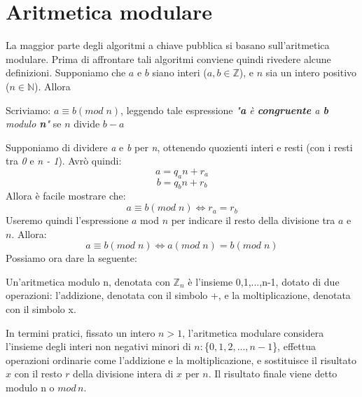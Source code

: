 \section{Aritmetica modulare}
La maggior parte degli algoritmi a chiave pubblica si basano sull'aritmetica modulare. Prima di affrontare tali algoritmi conviene quindi rivedere alcune definizioni.
\newline \newline
Supponiamo che $a$ e $b$ siano interi ($a,b \in \mathbb{Z}$), e $n$ sia un intero positivo ($n \in \mathbb{N}$). Allora 
\begin{defin}
Scriviamo: $a \equiv b(mod \; n)$, leggendo tale espressione \textit{"\textbf{a} è \textbf{congruente} a \textbf{b} modulo \textbf{n}"} se $n$ divide $b-a$
\end{defin}
Supponiamo di dividere \textit{a} e \textit{b} per \textit{n}, ottenendo quozienti interi e resti (con i resti tra \textit{0} e \textit{n - 1}). Avrò quindi:
\begin{equation}
a = q_a n + r_a
\end{equation}
\begin{equation}
b = q_b n + r_b
\end{equation}
Allora è facile mostrare che:
\begin{equation}
a \equiv b(mod \; n) \Leftrightarrow r_a = r_b
\end{equation}
Useremo quindi l'espressione $a$ mod $n$ per indicare il resto della divisione tra $a$ e $n$. Allora:
\begin{equation}
a \equiv b(mod \; n) \Leftrightarrow a(mod \; n) = b(mod \; n)
\end{equation}
Possiamo ora dare la seguente:
\begin{defin}
Un'aritmetica modulo n, denotata con $\mathbb{Z}_n$ è l'insieme {0,1,...,n-1}, dotato di due operazioni: l'addizione, denotata con il simbolo +, e la moltiplicazione, denotata con il simbolo x.
\end{defin}
In termini pratici, fissato un intero $ n>1 $, l'aritmetica modulare considera l'insieme degli interi non negativi minori di $n: $\{$0, 1, 2,..., n-1$\}, effettua operazioni ordinarie come l'addizione e la moltiplicazione, e sostituisce il risultato $x$ con il resto $r$ della divisione intera di $x$ per $n$. Il risultato finale viene detto modulo n o $mod \, n$. 

